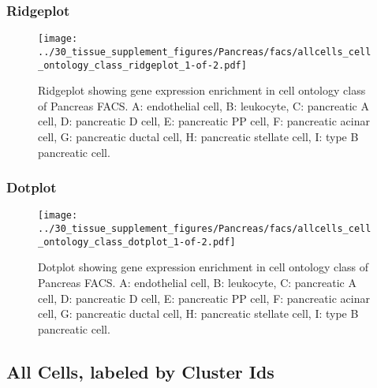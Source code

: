 \newpage
\newpage
\subsubsection{Ridgeplot}
\begin{figure}[h]
\centering
\texttt{[image: ../30\_tissue\_supplement\_figures/Pancreas/facs/allcells\_cell\_ontology\_class\_ridgeplot\_1-of-2.pdf]}

\caption{ Ridgeplot  showing gene expression enrichment in cell ontology class of Pancreas FACS. A: endothelial cell, B: leukocyte, C: pancreatic A cell, D: pancreatic D cell, E: pancreatic PP cell, F: pancreatic acinar cell, G: pancreatic ductal cell, H: pancreatic stellate cell, I: type B pancreatic cell.}
\end{figure}


\newpage
\newpage
\subsubsection{Dotplot}
\begin{figure}[h]
\centering
\texttt{[image: ../30\_tissue\_supplement\_figures/Pancreas/facs/allcells\_cell\_ontology\_class\_dotplot\_1-of-2.pdf]}

\caption{ Dotplot  showing gene expression enrichment in cell ontology class of Pancreas FACS. A: endothelial cell, B: leukocyte, C: pancreatic A cell, D: pancreatic D cell, E: pancreatic PP cell, F: pancreatic acinar cell, G: pancreatic ductal cell, H: pancreatic stellate cell, I: type B pancreatic cell.}
\end{figure}


\newpage
\subsection{All Cells, labeled by Cluster Ids}
